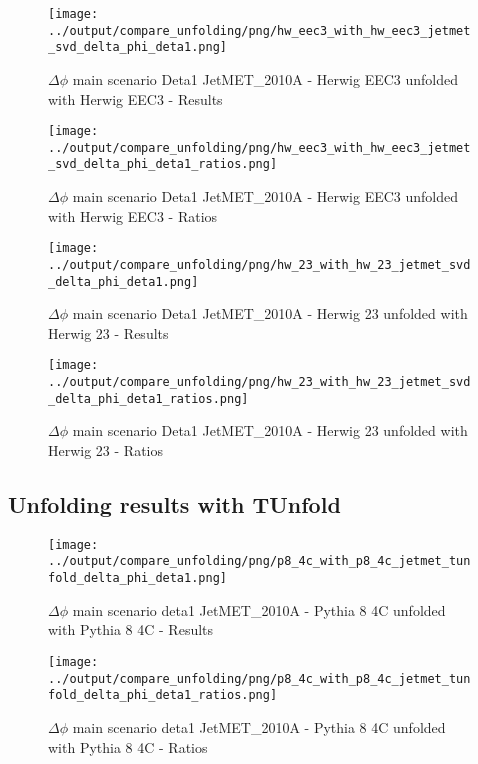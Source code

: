 \documentclass[11pt]{book}
\begin{document}
\begin{figure}[ht]
\centering
\texttt{[image: ../output/compare\_unfolding/png/hw\_eec3\_with\_hw\_eec3\_jetmet\_svd\_delta\_phi\_deta1.png]}
\caption{$\Delta\phi$ main scenario Deta1 JetMET\_2010A - Herwig EEC3 unfolded with Herwig EEC3 - Results}
\label{hw_eec3_hw_eec3_jetmet_svd_delta_phi_deta1_a}
\end{figure}

\begin{figure}[ht]
\centering
\texttt{[image: ../output/compare\_unfolding/png/hw\_eec3\_with\_hw\_eec3\_jetmet\_svd\_delta\_phi\_deta1\_ratios.png]}
\caption{$\Delta\phi$ main scenario Deta1 JetMET\_2010A - Herwig EEC3 unfolded with Herwig EEC3 - Ratios}
\label{hw_eec3_hw_eec3_jetmet_svd_delta_phi_deta1_b}
\end{figure}

\begin{figure}[ht]
\centering
\texttt{[image: ../output/compare\_unfolding/png/hw\_23\_with\_hw\_23\_jetmet\_svd\_delta\_phi\_deta1.png]}
\caption{$\Delta\phi$ main scenario Deta1 JetMET\_2010A - Herwig 23 unfolded with Herwig 23 - Results}
\label{hw_23_hw_23_jetmet_svd_delta_phi_deta1_a}
\end{figure}

\begin{figure}[ht]
\centering
\texttt{[image: ../output/compare\_unfolding/png/hw\_23\_with\_hw\_23\_jetmet\_svd\_delta\_phi\_deta1\_ratios.png]}
\caption{$\Delta\phi$ main scenario Deta1 JetMET\_2010A - Herwig 23 unfolded with Herwig 23 - Ratios}
\label{hw_23_hw_23_jetmet_svd_delta_phi_deta1_b}
\end{figure}


\clearpage
\subsection{Unfolding results with TUnfold}

\begin{figure}[ht]
\centering
\texttt{[image: ../output/compare\_unfolding/png/p8\_4c\_with\_p8\_4c\_jetmet\_tunfold\_delta\_phi\_deta1.png]}
\caption{$\Delta\phi$ main scenario deta1 JetMET\_2010A - Pythia 8 4C unfolded with Pythia 8 4C - Results}
\label{p8_p8_jetmet_tunfold_delta_phi_deta1_a}
\end{figure}

\begin{figure}[ht]
\centering
\texttt{[image: ../output/compare\_unfolding/png/p8\_4c\_with\_p8\_4c\_jetmet\_tunfold\_delta\_phi\_deta1\_ratios.png]}
\caption{$\Delta\phi$ main scenario deta1 JetMET\_2010A - Pythia 8 4C unfolded with Pythia 8 4C - Ratios}
\label{p8_p8_jetmet_tunfold_delta_phi_deta1_b}
\end{figure}
\end{document}
